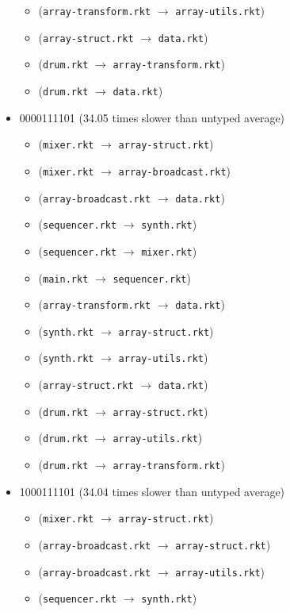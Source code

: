 \documentclass{article}
\newcommand{\mono}[1]{\texttt{#1}}
\begin{document}
\begin{itemize}
\begin{itemize}
  \item (\mono{array-transform.rkt} $\rightarrow$ \mono{array-utils.rkt})
  \item (\mono{array-struct.rkt} $\rightarrow$ \mono{data.rkt})
  \item (\mono{drum.rkt} $\rightarrow$ \mono{array-transform.rkt})
  \item (\mono{drum.rkt} $\rightarrow$ \mono{data.rkt})
  \end{itemize}
\item 0000111101 (34.05 times slower than untyped average)
  \begin{itemize}
  \item (\mono{mixer.rkt} $\rightarrow$ \mono{array-struct.rkt})
  \item (\mono{mixer.rkt} $\rightarrow$ \mono{array-broadcast.rkt})
  \item (\mono{array-broadcast.rkt} $\rightarrow$ \mono{data.rkt})
  \item (\mono{sequencer.rkt} $\rightarrow$ \mono{synth.rkt})
  \item (\mono{sequencer.rkt} $\rightarrow$ \mono{mixer.rkt})
  \item (\mono{main.rkt} $\rightarrow$ \mono{sequencer.rkt})
  \item (\mono{array-transform.rkt} $\rightarrow$ \mono{data.rkt})
  \item (\mono{synth.rkt} $\rightarrow$ \mono{array-struct.rkt})
  \item (\mono{synth.rkt} $\rightarrow$ \mono{array-utils.rkt})
  \item (\mono{array-struct.rkt} $\rightarrow$ \mono{data.rkt})
  \item (\mono{drum.rkt} $\rightarrow$ \mono{array-struct.rkt})
  \item (\mono{drum.rkt} $\rightarrow$ \mono{array-utils.rkt})
  \item (\mono{drum.rkt} $\rightarrow$ \mono{array-transform.rkt})
  \end{itemize}
\item 1000111101 (34.04 times slower than untyped average)
  \begin{itemize}
  \item (\mono{mixer.rkt} $\rightarrow$ \mono{array-struct.rkt})
  \item (\mono{array-broadcast.rkt} $\rightarrow$ \mono{array-struct.rkt})
  \item (\mono{array-broadcast.rkt} $\rightarrow$ \mono{array-utils.rkt})
  \item (\mono{sequencer.rkt} $\rightarrow$ \mono{synth.rkt})

\end{itemize}
\end{itemize}
\end{document}
